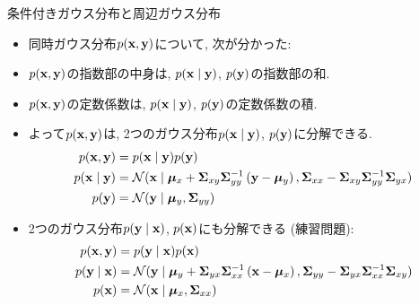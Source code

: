 \documentclass[dvipdfmx,notheorems,t]{beamer}
\begin{document}
\begin{frame}{条件付きガウス分布と周辺ガウス分布}
\begin{itemize}
  \item 同時ガウス分布$p(\vb{x}, \vb{y})$について, 次が分かった:
  \item $p(\vb{x}, \vb{y})$の指数部の中身は, $p(\vb{x} \mid \vb{y})$, $p(\vb{y})$の指数部の和.
  \item $p(\vb{x}, \vb{y})$の定数係数は, $p(\vb{x} \mid \vb{y})$, $p(\vb{y})$の定数係数の積.
  \item よって$p(\vb{x}, \vb{y})$は, 2つのガウス分布$p(\vb{x} \mid \vb{y})$, $p(\vb{y})$に分解できる.
  \begin{align*}
    p(\vb{x}, \vb{y}) &= p(\vb{x} \mid \vb{y}) p(\vb{y}) \\
    p(\vb{x} \mid \vb{y}) &= \mathcal{N}(\vb{x} \mid \vb*{\mu}_x
      + \vb{\Sigma}_{xy} \vb{\Sigma}_{yy}^{-1} \left( \vb{y} - \vb*{\mu}_y \right),
      \vb{\Sigma}_{xx} - \vb{\Sigma}_{xy} \vb{\Sigma}_{yy}^{-1} \vb{\Sigma}_{yx}) \\
    p(\vb{y}) &= \mathcal{N}(\vb{y} \mid \vb*{\mu}_y, \vb{\Sigma}_{yy})
  \end{align*}
  \item 2つのガウス分布$p(\vb{y} \mid \vb{x})$, $p(\vb{x})$にも分解できる (練習問題):
  \begin{align*}
    p(\vb{x}, \vb{y}) &= p(\vb{y} \mid \vb{x}) p(\vb{x}) \\
    p(\vb{y} \mid \vb{x}) &= \mathcal{N}(\vb{y} \mid \vb*{\mu}_y
      + \vb{\Sigma}_{yx} \vb{\Sigma}_{xx}^{-1} \left( \vb{x} - \vb*{\mu}_x \right),
      \vb{\Sigma}_{yy} - \vb{\Sigma}_{yx} \vb{\Sigma}_{xx}^{-1} \vb{\Sigma}_{xy}) \\
    p(\vb{x}) &= \mathcal{N}(\vb{x} \mid \vb*{\mu}_x, \vb{\Sigma}_{xx})
  \end{align*}
\end{itemize}
\end{frame}
\end{document}
